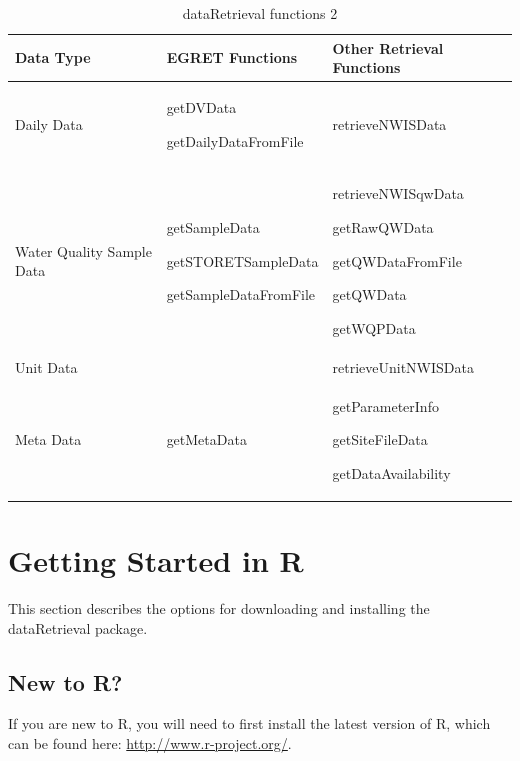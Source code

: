 \documentclass[a4paper,11pt]{article}\usepackage[]{graphicx}\usepackage[]{color}
\begin{document}
\begin{table}[!ht]
\begin{minipage}{\linewidth}
\begin{center}
\caption{dataRetrieval functions 2} 
\begin{tabular}{l p{4cm} p{4cm}}
  \hline
Data Type & EGRET Functions & Other Retrieval Functions \\ 
  \hline
  Daily Data & getDVData \par getDailyDataFromFile & retrieveNWISData \\
  Water Quality Sample Data & getSampleData \par getSTORETSampleData \par getSampleDataFromFile \par & retrieveNWISqwData \par getRawQWData \par getQWDataFromFile \par getQWData \par getWQPData\\  
  Unit Data& & retrieveUnitNWISData \\  
  Meta Data & getMetaData & getParameterInfo \par getSiteFileData \par getDataAvailability \\
   \hline
\end{tabular}
\end{center}
\end{minipage}
\end{table}


\appendix

\section{Getting Started in R}
\label{sec:appendix1}
This section describes the options for downloading and installing the dataRetrieval package.

\subsection{New to R?}
If you are new to R, you will need to first install the latest version of R, which can be found here: \url{http://www.r-project.org/}.
\end{document}
